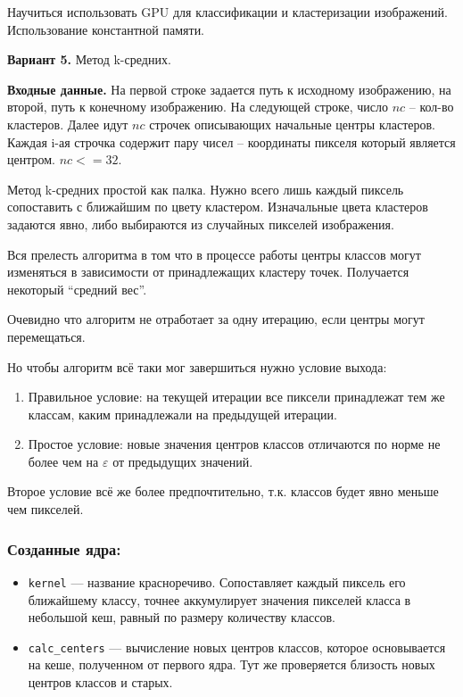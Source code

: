 \documentclass[12pt]{article}
\begin{document}


Научиться использовать GPU для классификации и
кластеризации изображений. Использование константной памяти.

\textbf{Вариант 5.} Метод k-средних.

\textbf{Входные данные.}
На первой строке задается путь к исходному изображению,
на второй, путь к конечному изображению. На следующей строке, число $nc$ -- кол-во
кластеров. Далее идут $nc$ строчек описывающих начальные центры кластеров. Каждая
i-ая строчка содержит пару чисел -- координаты пикселя который является центром.
$nc <= 32$.

\nvidia


Метод k-средних простой как палка.
Нужно всего лишь каждый пиксель сопоставить с ближайшим по цвету кластером.
Изначальные цвета кластеров задаются явно, либо выбираются из случайных пикселей изображения.

Вся прелесть алгоритма в том что в процессе работы центры классов могут изменяться в зависимости
от принадлежащих кластеру точек. Получается некоторый ``средний вес''.

Очевидно что алгоритм не отработает за одну итерацию, если центры могут перемещаться.

Но чтобы алгоритм всё таки мог завершиться нужно условие выхода:

\begin{enumerate}
	\item Правильное условие: на текущей итерации все пиксели принадлежат тем же классам, каким принадлежали
	      на предыдущей итерации.
	\item Простое условие: новые значения центров классов отличаются по норме не более чем на
	      $\varepsilon$ от предыдущих значений.
\end{enumerate}

Второе условие всё же более предпочтительно, т.к. классов будет явно меньше чем пикселей.


\subsubsection*{Созданные ядра:}

\begin{itemize}
	\item \lstinline|kernel| --- название красноречиво. Сопоставляет каждый пиксель
	      его ближайшему классу, точнее аккумулирует значения пикселей класса в небольшой кеш,
	      равный по размеру количеству классов.
	\item \lstinline|calc_centers| --- вычисление новых центров классов, которое основывается
	      на кеше, полученном от первого ядра. Тут же проверяется близость новых центров классов и старых.
\end{itemize}
\end{document}
